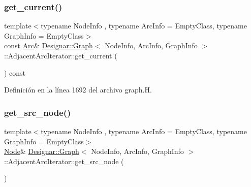 \subsubsection{\texorpdfstring{get\+\_\+current()}{get\_current()}\hspace{0.1cm}{\footnotesize\ttfamily [2/2]}}
{\footnotesize\ttfamily template$<$typename Node\+Info , typename Arc\+Info  = Empty\+Class, typename Graph\+Info  = Empty\+Class$>$ \\
const \hyperlink{class_designar_1_1_graph_a74c730ef4ce2d20f998d72bd25c2b5bf}{Arc}\& \hyperlink{class_designar_1_1_graph}{Designar\+::\+Graph}$<$ Node\+Info, Arc\+Info, Graph\+Info $>$\+::Adjacent\+Arc\+Iterator\+::get\+\_\+current (\begin{DoxyParamCaption}{ }\end{DoxyParamCaption}) const\hspace{0.3cm}{\ttfamily [inline]}}



Definición en la línea 1692 del archivo graph.\+H.

\mbox{\label{class_designar_1_1_graph_1_1_adjacent_arc_iterator_a0a5f3238f6abde756b4498a31558a255}} 
\subsubsection{\texorpdfstring{get\+\_\+src\+\_\+node()}{get\_src\_node()}\hspace{0.1cm}{\footnotesize\ttfamily [1/2]}}
{\footnotesize\ttfamily template$<$typename Node\+Info , typename Arc\+Info  = Empty\+Class, typename Graph\+Info  = Empty\+Class$>$ \\
\hyperlink{class_designar_1_1_graph_a5dfc7dba9d092ac489c72e40390c37d0}{Node}\& \hyperlink{class_designar_1_1_graph}{Designar\+::\+Graph}$<$ Node\+Info, Arc\+Info, Graph\+Info $>$\+::Adjacent\+Arc\+Iterator\+::get\+\_\+src\+\_\+node (\begin{DoxyParamCaption}{ }\end{DoxyParamCaption})\hspace{0.3cm}{\ttfamily [inline]}}



